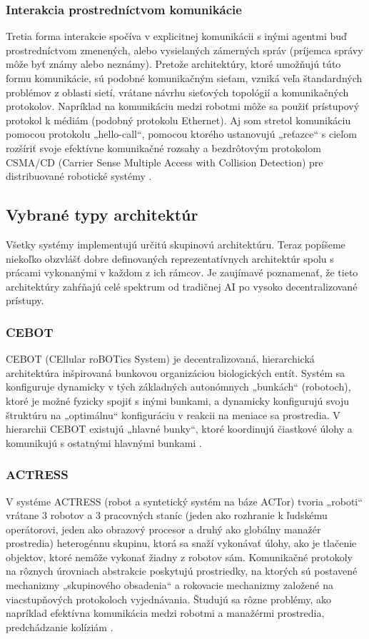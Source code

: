 \subsubsection{Interakcia prostredníctvom komunikácie}
Tretia forma interakcie spočíva v explicitnej komunikácii s inými agentmi buď prostredníctvom zmenených, alebo
vysielaných zámerných správ (príjemca správy môže byť známy alebo neznámy). Pretože architektúry,
ktoré umožňujú túto formu komunikácie, sú podobné komunikačným sieťam, vzniká veľa štandardných problémov z oblasti
sietí, vrátane návrhu sieťových topológií a komunikačných protokolov. Napríklad na komunikáciu medzi robotmi
môže sa použiť prístupový protokol k médiám (podobný protokolu Ethernet). Aj som stretol komunikáciu pomocou protokolu
„hello-call“, pomocou ktorého ustanovujú „reťazce“ s cieľom rozšíriť svoje
efektívne komunikačné rozsahy a bezdrôtovým protokolom CSMA/CD (Carrier Sense Multiple Access with Collision Detection)
pre distribuované robotické systémy \citep{wang}.

\subsection{Vybrané typy architektúr}
Všetky systémy implementujú určitú skupinovú architektúru. Teraz popíšeme niekoľko obzvlášť dobre definovaných
reprezentatívnych architektúr spolu s prácami vykonanými v každom z ich rámcov. Je zaujímavé poznamenať, že tieto
architektúry zahŕňajú celé spektrum od tradičnej AI po vysoko decentralizované prístupy.

\subsubsection{CEBOT}
CEBOT (CEllular roBOTics System) je decentralizovaná, hierarchická architektúra inšpirovaná bunkovou organizáciou
biologických entít. Systém sa konfiguruje dynamicky  v tých základných autonómnych „bunkách“ (robotoch), ktoré je
možné fyzicky spojiť s inými bunkami, a dynamicky konfigurujú svoju štruktúru na „optimálnu“ konfiguráciu v reakcii na
meniace sa prostredia. V hierarchii CEBOT existujú „hlavné bunky“, ktoré koordinujú čiastkové úlohy a komunikujú s
ostatnými hlavnými bunkami \citep{michael} \citep{beatriz}.

\subsubsection{ACTRESS}
V systéme ACTRESS (robot a syntetický systém na báze ACTor) tvoria „roboti“ vrátane 3 robotov a 3 pracovných staníc
(jeden ako rozhranie k ľudskému operátorovi, jeden ako obrazový procesor a druhý ako globálny manažér prostredia)
heterogénnu skupinu, ktorá sa snaží vykonávať úlohy, ako je tlačenie objektov, ktoré nemôže vykonať žiadny z
robotov sám. Komunikačné protokoly na rôznych úrovniach abstrakcie poskytujú prostriedky, na ktorých
sú postavené mechanizmy „skupinového obsadenia“ a rokovacie mechanizmy založené na viacstupňových protokoloch vyjednávania. Študujú sa rôzne problémy, ako napríklad efektívna komunikácia medzi robotmi a manažérmi
prostredia, predchádzanie kolíziám \citep{beatriz}.

